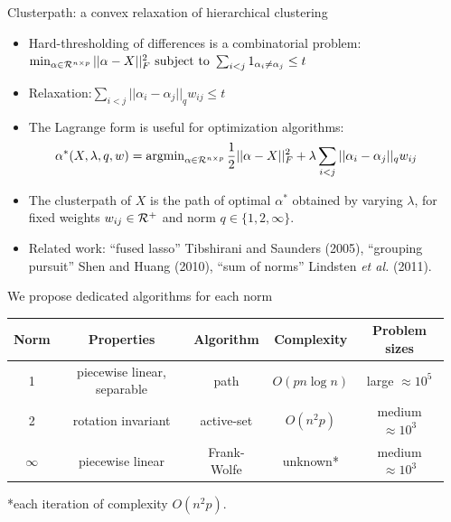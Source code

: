 \documentclass[final]{beamer}
\begin{document}
\begin{frame}{}
\begin{columns}[T]
\begin{column}{0.315\paperwidth}
\begin{block}{Clusterpath: a convex relaxation of hierarchical
    clustering}
\begin{itemize}
\item Hard-thresholding of differences is a combinatorial problem:
$
 \min_{    \alpha\in{\mathcal R}^{n\times p}}       ||\alpha-X||_F^2 \text{  subject to  }
\sum_{i<j}1_{\alpha_i\neq\alpha_j} \leq t$
\item \alert{Relaxation:$\sum_{i<j}||\alpha_i-\alpha_j||_q w_{ij}\leq t$}
\item The Lagrange form is useful for optimization algorithms:
$$
\alpha^*(X,\lambda,q,w)=\operatorname{argmin}_{\alpha\in{\mathcal R}^{n\times p}}
\frac 1 2||\alpha-X||_F^2+\lambda\sum_{i<j}||\alpha_i-\alpha_j||_q w_{ij}
$$ 
\item The \alert<1>{clusterpath} of $X$ is the path of optimal
  $\alpha^*$ obtained by varying $\lambda$, for fixed weights
  $w_{ij}\in{\mathcal R}^+$ and norm $q\in\{1,2,\infty\}$.
\item 
 Related work: ``fused lasso'' Tibshirani and Saunders (2005),
``grouping pursuit'' Shen and Huang (2010), ``sum of norms'' Lindsten
\emph{et al.}  (2011).
\end{itemize} 
\end{block}

 
\vspace{-1in}
\begin{block}{We propose dedicated algorithms for each norm}
{\small
\begin{center}
\begin{tabular}{ccccc}
\hline
Norm & Properties & Algorithm &Complexity & Problem sizes \\
\hline
1 &piecewise linear, separable&path&$O(pn\log n)$&large $\approx 10^5$  \\
2 &rotation invariant&active-set& $O(n^2p)$&medium $\approx10^3$ \\
$\infty$ & piecewise linear&Frank-Wolfe&unknown*&medium $\approx 10^3$\\
\hline
\end{tabular}
\end{center}
*each iteration of complexity $O(n^2p)$.
}
\end{block}

\end{column}\hfill

\begin{column}{0.315\linewidth}


\end{column}
\end{columns}
\end{frame}
\end{document}
